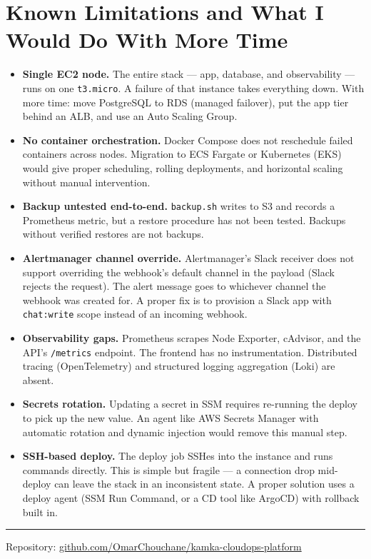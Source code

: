 \documentclass[11pt,a4paper]{article}
\begin{document}
\section{Known Limitations and What I Would Do With More Time}

\begin{itemize}[leftmargin=*, itemsep=4pt]

  \item \textbf{Single EC2 node.} The entire stack — app, database, and observability — runs on one \texttt{t3.micro}. A failure of that instance takes everything down. With more time: move PostgreSQL to RDS (managed failover), put the app tier behind an ALB, and use an Auto Scaling Group.

  \item \textbf{No container orchestration.} Docker Compose does not reschedule failed containers across nodes. Migration to ECS Fargate or Kubernetes (EKS) would give proper scheduling, rolling deployments, and horizontal scaling without manual intervention.

  \item \textbf{Backup untested end-to-end.} \texttt{backup.sh} writes to S3 and records a Prometheus metric, but a restore procedure has not been tested. Backups without verified restores are not backups.

  \item \textbf{Alertmanager channel override.} Alertmanager's Slack receiver does not support overriding the webhook's default channel in the payload (Slack rejects the request). The alert message goes to whichever channel the webhook was created for. A proper fix is to provision a Slack app with \texttt{chat:write} scope instead of an incoming webhook.

  \item \textbf{Observability gaps.} Prometheus scrapes Node Exporter, cAdvisor, and the API's \texttt{/metrics} endpoint. The frontend has no instrumentation. Distributed tracing (OpenTelemetry) and structured logging aggregation (Loki) are absent.

  \item \textbf{Secrets rotation.} Updating a secret in SSM requires re-running the deploy to pick up the new value. An agent like AWS Secrets Manager with automatic rotation and dynamic injection would remove this manual step.

  \item \textbf{SSH-based deploy.} The deploy job SSHes into the instance and runs commands directly. This is simple but fragile — a connection drop mid-deploy can leave the stack in an inconsistent state. A proper solution uses a deploy agent (SSM Run Command, or a CD tool like ArgoCD) with rollback built in.

\end{itemize}

\vspace{12pt}
\noindent\color{midgray}\rule{\linewidth}{0.4pt}
\vspace{4pt}
\begin{center}
  \small\color{darkgray}
  Repository: \href{https://github.com/OmarChouchane/kamka-cloudops-platform}{github.com/OmarChouchane/kamka-cloudops-platform}
\end{center}
\end{document}

